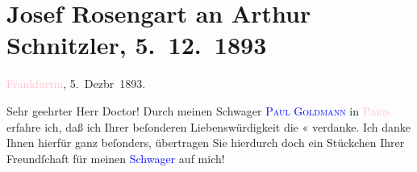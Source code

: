 

\renewcommand{\erwaehntePersonen}{Personen: Paul Goldmann, Josef Rosengart}
\renewcommand{\erwaehnteOrte}{Orte: Frankfurt am Main, Paris, Volkstheater, Wien}
\renewcommand{\erwaehnteWerke}{Werke: Das Märchen. Schauspiel in drei Aufzügen, Internationale klinische Rundschau}
\section[Josef Rosengart an Arthur Schnitzler, 5. 12. 1893]{Josef Rosengart an Arthur Schnitzler, 5. 12. 1893}
\nopagebreak{}
\rehead{ }\normalsize\beginnumbering{}
\toendnotes[C]{\smallbreak\pagebreak[2]}
\toendnotes[C]{\smallbreak}
\pstart
           \raggedleft{}{\pb}\textcolor{pink}{Frankfurtm}{}\ledrightnote{\textcolor{pink}{Frankfurt am Main}}, 5. Dezbr 1893.\pend
           
\pstart{}Sehr geehrter Herr Doctor!\pend
\pstart
           Durch meinen Schwager \textsc{\textcolor{blue}{Paul Goldmann}{}\ledrightnote{\textcolor{blue}{Paul Goldmann}}} in \textsc{\textcolor{pink}{Paris}{}\ledrightnote{\textcolor{pink}{Paris}}} erfahre ich, daß ich Ihrer beſonderen Liebenswürdigkeit die \label{K_L02798-1v}\label{K_L02798-1h}« verdanke. Ich danke Ihnen hierfür ganz beſonders, übertragen Sie hierdurch
               doch ein Stückchen Ihrer Freundſchaft für {\pb}meinen \textcolor{blue}{Schwager}{}\ledrightnote{{$\rightarrow$}\textcolor{blue}{Paul Goldmann}} auf mich!\pend
           
